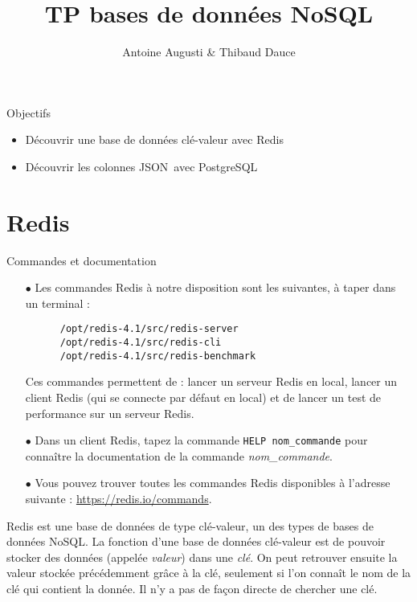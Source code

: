 \documentclass[a4paper,10pt]{article}
\title{TP bases de données NoSQL}
\date{}
\author{Antoine Augusti \& Thibaud Dauce}
\begin{document}
\maketitle
\sloppy
\begin{bclogo}[logo = \bclampe, arrondi = 0.1, ombre = true, epOmbre = 0.2, couleurOmbre = black!30, couleurBord=bleuF, barre=none]{Objectifs}
  \begin{itemize}
   \item Découvrir une base de données clé-valeur avec Redis
   \item Découvrir les colonnes JSON avec PostgreSQL
  \end{itemize}
\end{bclogo}

\section{Redis}
  \begin{bclogo}[logo = \bctakecare, arrondi = 0.1, ombre = true , epOmbre = 0.1, couleurOmbre = black!30,  barre =none, couleurBarre=bleuF]{Commandes et documentation}
    \begin{itemize}
    \item[$\bullet$] Les commandes Redis à notre disposition sont les suivantes, à taper dans un terminal :
    \begin{verbatim}
      /opt/redis-4.1/src/redis-server
      /opt/redis-4.1/src/redis-cli
      /opt/redis-4.1/src/redis-benchmark
    \end{verbatim}
    \item[] Ces commandes permettent de : lancer un serveur Redis en local, lancer un client Redis (qui se connecte par défaut en local) et de lancer un test de performance sur un serveur Redis.
    \item[$\bullet$] Dans un client Redis, tapez la commande \texttt{HELP nom\_commande} pour connaître la documentation de la commande \textit{nom\_commande}.
    \item[$\bullet$] Vous pouvez trouver toutes les commandes Redis disponibles à l'adresse suivante : \url{https://redis.io/commands}.

   \end{itemize}
  \end{bclogo}

  Redis est une base de données de type clé-valeur, un des types de bases de données NoSQL. La fonction d'une base de données clé-valeur est de pouvoir stocker des données (appelée \textit{valeur}) dans une \textit{clé}. On peut retrouver ensuite la valeur stockée précédemment grâce à la clé, seulement si l'on connaît le nom de la clé qui contient la donnée. Il n'y a pas de façon directe de chercher une clé.\\
\end{document}
